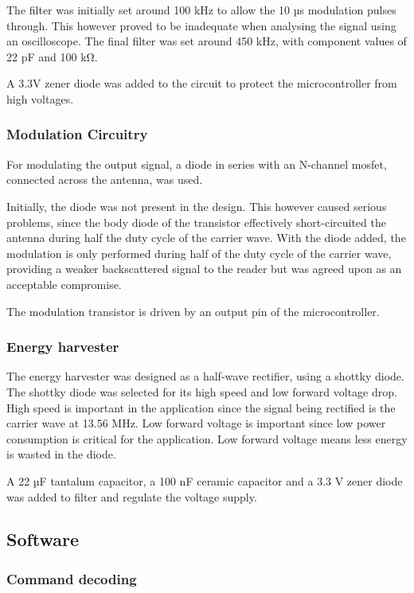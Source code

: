 The filter was initially set around 100 kHz to allow the 10 µs modulation pulses\cite{rfid-iso} through.
This however proved to be inadequate when analysing the signal using an oscilloscope.
The final filter was set around 450 kHz, with component values of 22 pF and 100 kΩ.

A 3.3V zener diode was added to the circuit to protect the microcontroller from high voltages.

\subsubsection{Modulation Circuitry}
For modulating the output signal, a diode in series with an N-channel mosfet, connected across the antenna, was used.

Initially, the diode was not present in the design.
This however caused serious problems, since the body diode of the transistor effectively short-circuited the antenna during half the duty cycle of the carrier wave.
With the diode added, the modulation is only performed during half of the duty cycle of the carrier wave, providing a weaker backscattered signal to the reader but was agreed upon as an acceptable compromise.

The modulation transistor is driven by an output pin of the microcontroller.

\subsubsection{Energy harvester}
The energy harvester was designed as a half-wave rectifier, using a shottky diode.
The shottky diode was selected for its high speed and low forward voltage drop.
High speed is important in the application since the signal being rectified is the carrier wave at 13.56 MHz.
Low forward voltage is important since low power consumption is critical for the application.
Low forward voltage means less energy is wasted in the diode.

A 22 µF tantalum capacitor, a 100 nF ceramic capacitor and a 3.3 V zener diode was added to filter and regulate the voltage supply.

\subsection{Software}

\subsubsection{Command decoding}
